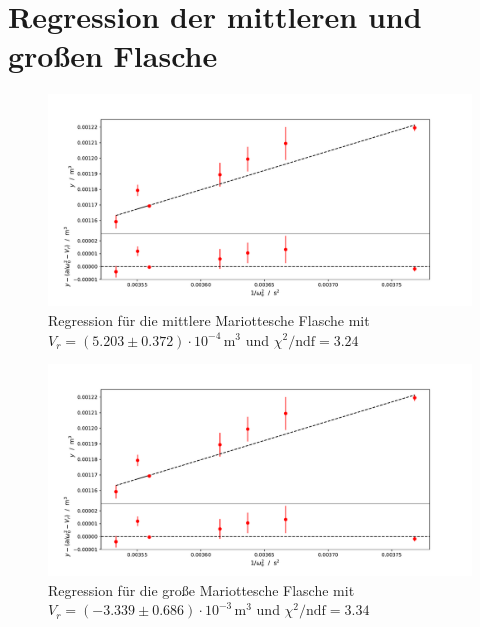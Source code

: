 \documentclass[a4paper, 12pt]{scrartcl}
\begin{document}
\section{Regression der mittleren und großen Flasche}\label{app:reg}
\begin{figure}[H]
\centering
\includegraphics[width=\textwidth]{plots/regression_mittel.pdf}
\caption{Regression für die mittlere Mariottesche Flasche mit $V_r = (5.203 \pm 0.372)\cdot 10^{-4}\,\text{m}^3$ und $\chi^2/\text{ndf} = 3.24$}
\end{figure}
\begin{figure}[H]
\centering
\includegraphics[width=\textwidth]{plots/regression_grosse.pdf}
\caption{Regression für die große Mariottesche Flasche mit $V_r = (-3.339 \pm 0.686)\cdot 10^{-3}\,\text{m}^3$ und $\chi^2/\text{ndf} = 3.34$}
\end{figure}
\end{document}
